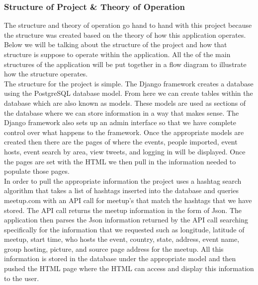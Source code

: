 \documentclass[draftclsnofoot,10pt,onecolumn]{IEEEtran} %
\begin{document}
\subsubsection{Structure of Project \& Theory of Operation}

The structure and theory of operation go hand to hand with this project because the structure was created based on the theory of how this application operates. Below we will be talking about the structure of the project and how that structure is suppose to operate within the application. All the of the main structures of the application will be put together in a flow diagram to illustrate how the structure operates.\\

The structure for the project is simple. The Django framework creates a database using the PostgreSQL database model. From here we 
can create tables within the database which are also known as models. These models are used as sections of the database where we can 
store information in a way that makes sense. The Django framework also sets up an admin interface so that we have complete control
over what happens to the framework. Once the appropriate models are created then there are the pages of where the events, people imported, event hosts, event search by area, view tweets, and logging in will be displayed. Once the pages are set with the HTML we then pull in the information needed to populate those pages.\\

In order to pull the appropriate information the project uses a hashtag search algorithm that takes a list of hashtags inserted into the database and queries meetup.com with an API call for meetup's that match the hashtags that we have stored. The API call returns the meetup information in the form of Json. The application then parses the Json information returned by the API call searching specifically for the information that we requested such as longitude, latitude of meetup, start time, who hosts the event, country, state, address, event name, group hosting, picture, and source page address for the meetup. All this information is stored in the database under the appropriate model and then pushed the HTML page where the HTML can access and display this information to the user. \\
\end{document}
